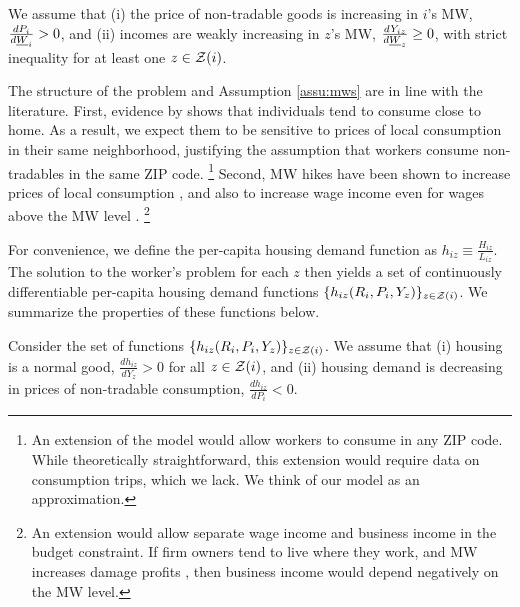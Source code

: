 \begin{assu}\label{assu:mws}
    We assume that
    (i) the price of non-tradable goods is increasing in $i$'s MW, 
    $\frac{d P_i}{d \underline{W}_i} > 0$, and
    (ii) incomes are weakly increasing in $z$'s MW, 
    $\frac{d Y_{iz}}{d \underline{W}_z} \geq 0$, with strict inequality 
    for at least one $z\in\mathcal{Z}(i)$.
\end{assu}

The structure of the problem and Assumption \ref{assu:mws} are in line with 
the literature.
First, evidence by \textcite{MiyauchiEtAl2021} shows that individuals tend to 
consume close to home.
As a result, we expect them to be sensitive to prices of local consumption in 
their same neighborhood, justifying the assumption that workers consume 
non-tradables in the same ZIP code.%
\footnote{An extension of the model would allow workers to consume in any ZIP 
code.
While theoretically straightforward, this extension would require data on 
consumption trips, which we lack.
We think of our model as an approximation.}
Second, MW hikes have been shown to increase prices of local consumption 
\parencite[e.g.,][]{AllegrettoReich2018, Leung2021},
and also to increase wage income even for wages above the MW level 
\parencite[e.g.,][]{CegnizEtAl2019,Dube2019Income}.%
\footnote{An extension would allow separate wage income and business income in 
the budget constraint.
If firm owners tend to live where they work, and MW increases damage profits
\parencite[as found by, e.g.,][]{DracaMachinVanreenen2011, HarasztosiLidner2019},
then business income would depend negatively on the MW level.}

For convenience, we define the per-capita housing demand function as 
$h_{iz} \equiv \frac{H_{iz}}{L_{iz}}$.
The solution to the worker's problem for each $z$ then yields a set of 
continuously differentiable per-capita housing demand functions 
$\{h_{iz} (R_i, P_i, Y_z)\}_{z\in\mathcal{Z}(i)}$.
We summarize the properties of these functions below.

\begin{assu}\label{assu:housing_demand}
    Consider the set of functions $\{h_{iz} (R_i, P_i, Y_z)\}_{z\in\mathcal{Z}(i)}$.
    We assume that
    (i) housing is a normal good, 
    $\frac{d h_{iz}}{d Y_z} > 0$ for all $z\in\mathcal{Z}(i)$,
    and
    (ii) housing demand is decreasing in prices of non-tradable consumption, 
    $\frac{d h_{iz}}{d P_i} < 0$.
\end{assu}

